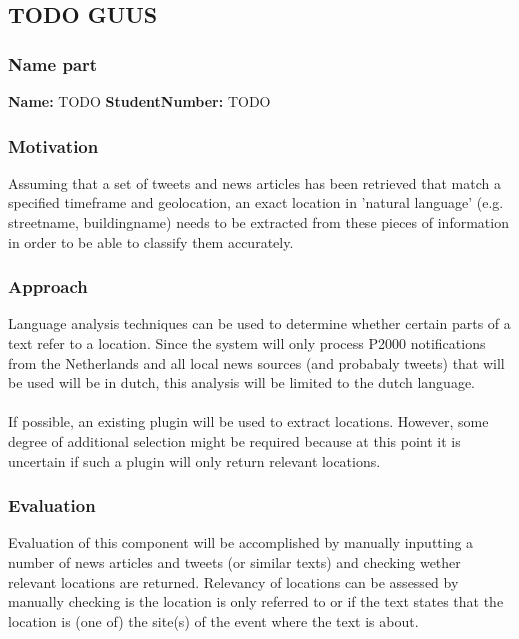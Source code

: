 \subsection{TODO GUUS}
\subsubsection*{Name part}
\textbf{Name:} TODO \indent \textbf{StudentNumber:} TODO

\subsubsection*{Motivation}
Assuming that a set of tweets and news articles has been retrieved that match a specified timeframe and geolocation, an exact location in 'natural language' (e.g. streetname, buildingname) needs to be extracted from these pieces of information in order to be able to classify them accurately. 

\subsubsection*{Approach}
Language analysis techniques can be used to determine whether certain parts of a text refer to a location. Since the system will only process P2000 notifications from the Netherlands and all local news sources (and probabaly tweets) that will be used will be in dutch, this analysis will be limited to the dutch language.\\\\
If possible, an existing plugin will be used to extract locations. However, some degree of additional selection might be required because at this point it is uncertain if such a plugin will only return relevant locations.

\subsubsection*{Evaluation }
Evaluation of this component will be accomplished by manually inputting a number of news articles and tweets (or similar texts) and checking wether relevant locations are returned. Relevancy of locations can be assessed by manually checking is the location is only referred to or if the text states that the location is (one of) the site(s) of the event where the text is about.